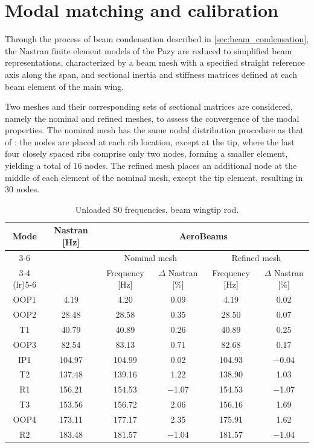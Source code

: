 \documentclass[journal]{new-aiaa}
\begin{document}
\section{Modal matching and calibration}

Through the process of beam condensation described in \cref{sec:beam_condensation}, the Nastran finite element models of the Pazy are reduced to simplified beam representations, characterized by a beam mesh with a specified straight reference axis along the span, and sectional inertia and stiffness matrices defined at each beam element of the main wing. 

Two meshes and their corresponding sets of sectional matrices are considered, namely the nominal and refined meshes, to assess the convergence of the modal properties. The nominal mesh has the same nodal distribution procedure as that of \cite{riso2022low}: the nodes are placed at each rib location, except at the tip, where the last four closely spaced ribs comprise only two nodes, forming a smaller element, yielding a total of 16 nodes. The refined mesh places an additional node at the middle of each element of the nominal mesh, except the tip element, resulting in 30 nodes.

\begin{table}[ht!]
    \centering
    \caption{Unloaded S0 frequencies, beam wingtip rod.}
    \label{tab:S0_beamrod_modal_frequencies}
    \begin{tabular}{c c cc cc}
        \toprule
        \multirow{3}{*}{Mode} & \multirow{3}{*}{Nastran [Hz]} & \multicolumn{4}{c}{AeroBeams} \\
        \cmidrule(lr){3-6}
        & & \multicolumn{2}{c}{Nominal mesh} & \multicolumn{2}{c}{Refined mesh} \\
        \cmidrule(lr){3-4} \cmidrule(lr){5-6}
        & & Frequency [Hz] & $\Delta$ Nastran [\%] & Frequency [Hz] & $\Delta$ Nastran [\%] \\
        \midrule
        OOP1 & 4.19 & 4.20 & 0.09 & 4.19 & 0.02 \\
        OOP2 & 28.48 & 28.58 & 0.35 & 28.50 & 0.07 \\
        T1 & 40.79 & 40.89 & 0.26 & 40.89 & 0.25 \\
        OOP3 & 82.54 & 83.13 & 0.71 & 82.68 & 0.17 \\
        IP1 & 104.97 & 104.99 & 0.02 & 104.93 & $-$0.04 \\
        T2 & 137.48 & 139.16 & 1.22 & 138.90 & 1.03 \\
        R1 & 156.21 & 154.53 & $-$1.07 & 154.53 & $-$1.07 \\
        T3 & 153.56 & 156.72 & 2.06 & 156.16 & 1.69 \\
        OOP4 & 173.11 & 177.17 & 2.35 & 175.91 & 1.62 \\
        R2 & 183.48 & 181.57 & $-$1.04 & 181.57 & $-$1.04 \\
        \bottomrule
    \end{tabular}
\end{table}
\end{document}
